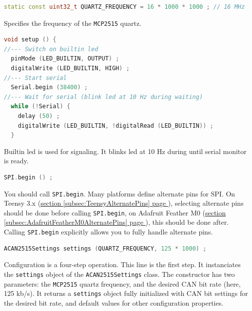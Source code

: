 \documentclass[10pt, a4paper, obeyspaces, openany]{extarticle}
\newcommand\refSubsectionPage[1]{\hyperref[subsec:#1]{section \ref*{subsec:#1} page \pageref{subsec:#1}}}
\begin{document}
%




{ \small\begin{lstlisting}[language=c++]
static const uint32_t QUARTZ_FREQUENCY = 16 * 1000 * 1000 ; // 16 MHz
\end{lstlisting}}

Specifies the frequency of the \texttt{MCP2515} quartz.








{ \small\begin{lstlisting}[language=c++]
void setup () {
//--- Switch on builtin led
  pinMode (LED_BUILTIN, OUTPUT) ;
  digitalWrite (LED_BUILTIN, HIGH) ;
//--- Start serial
  Serial.begin (38400) ;
//--- Wait for serial (blink led at 10 Hz during waiting)
  while (!Serial) {
    delay (50) ;
    digitalWrite (LED_BUILTIN, !digitalRead (LED_BUILTIN)) ;
  }
\end{lstlisting}}
Builtin led is used for signaling. It blinks led at 10 Hz during until serial monitor is ready.



{ \small\begin{lstlisting}[language=c++]
  SPI.begin () ;
\end{lstlisting}}
You should call \texttt{SPI.begin}. Many platforms define alternate pins for SPI. On Teensy 3.x (\refSubsectionPage{TeensyAlternatePins}), selecting alternate pins should be done before calling \texttt{SPI.begin}, on Adafruit Feather M0 (\refSubsectionPage{AdafruitFeatherM0AlternatePins}), this should be done after. Calling \texttt{SPI.begin} explicitly allows you to fully handle alternate pins.

{ \small\begin{lstlisting}[language=c++]
  ACAN2515Settings settings (QUARTZ_FREQUENCY, 125 * 1000) ;
\end{lstlisting}}

Configuration is a four-step operation. This line is the first step. It instanciates the \texttt{settings} object of the \texttt{ACAN2515Settings} class. The constructor has two parameters: the \texttt{MCP2515} quartz frequency, and the desired CAN bit rate (here, 125 kb/s). It returns a \texttt{settings} object fully initialized with CAN bit settings for the desired bit rate, and default values for other configuration properties.
\end{document}
